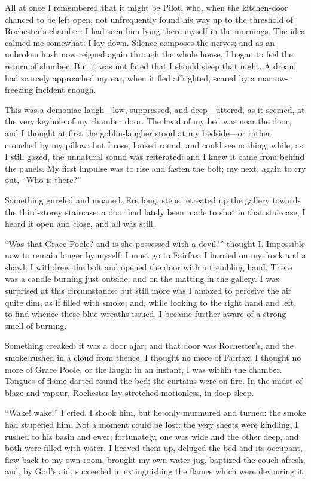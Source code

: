 All at once I remembered that it might be Pilot, who, when the
kitchen-door chanced to be left open, not unfrequently found his way up
to the threshold of \Mr{}  Rochester's chamber: I had seen him lying there
myself in the mornings. The idea calmed me somewhat: I lay down.
Silence composes the nerves; and as an unbroken hush now reigned again
through the whole house, I began to feel the return of slumber. But it
was not fated that I should sleep that night. A dream had scarcely
approached my ear, when it fled affrighted, scared by a marrow-freezing
incident enough.

This was a demoniac laugh---low, suppressed, and deep---uttered, as it
seemed, at the very keyhole of my chamber door. The head of my bed was
near the door, and I thought at first the goblin-laugher stood at my
bedside---or rather, crouched by my pillow: but I rose, looked round,
and could see nothing; while, as I still gazed, the unnatural sound was
reiterated: and I knew it came from behind the panels. My first impulse
was to rise and fasten the bolt; my next, again to cry out, \enquote{Who
	is there?}

Something gurgled and moaned. Ere long, steps retreated up the gallery
towards the third-storey staircase: a door had lately been made to shut
in that staircase; I heard it open and close, and all was still.

\enquote{Was that Grace Poole? and is she possessed with a devil?}
thought I\@. Impossible now to remain longer by myself: I must go to \Mrs{}
Fairfax. I hurried on my frock and a shawl; I withdrew the bolt and
opened the door with a trembling hand. There was a candle burning just
outside, and on the matting in the gallery. I was surprised at this
circumstance: but still more was I amazed to perceive the air quite dim,
as if filled with smoke; and, while looking to the right hand and left,
to find whence these blue wreaths issued, I became further aware of a
strong smell of burning.

Something creaked: it was a door ajar; and that door was \Mr{}
Rochester's, and the smoke rushed in a cloud from thence. I thought no
more of \Mrs{} Fairfax; I thought no more of Grace Poole, or the laugh: in
an instant, I was within the chamber. Tongues of flame darted round the
bed: the curtains were on fire. In the midst of blaze and vapour, \Mr{}
Rochester lay stretched motionless, in deep sleep.

\enquote{Wake! wake!} I cried. I shook him, but he only murmured and
turned: the smoke had stupefied him. Not a moment could be lost: the
very sheets were kindling, I rushed to his basin and ewer; fortunately,
one was wide and the other deep, and both were filled with water. I
heaved them up, deluged the bed and its occupant, flew back to my own
room, brought my own water-jug, baptized the couch afresh, and, by God's
aid, succeeded in extinguishing the flames which were devouring it.

